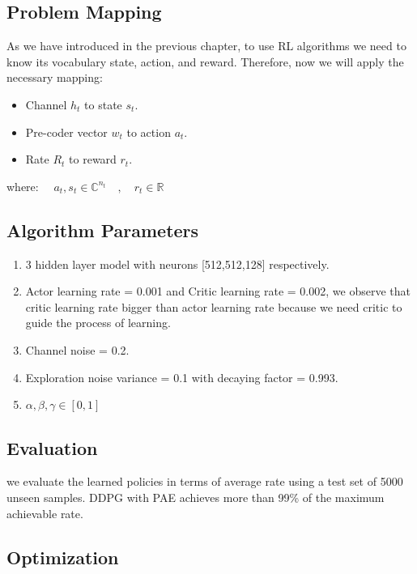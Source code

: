 \subsection{Problem Mapping}
As we have introduced in the previous chapter, to use RL algorithms we need to know its vocabulary state, action, and reward. Therefore, now we will apply the necessary mapping:
\begin{itemize}
    \item Channel $h_t$ to state $s_t$.
    \item Pre-coder vector $w_t$ to action $a_t$.
    \item Rate $R_t$ to reward $r_t$.
\end{itemize}
where: $\quad a_t, s_t \in \mathbb{C}^{n_t} \quad , \quad r_t \in \mathbb{R}$

\subsection{Algorithm Parameters}
\begin{enumerate}
    \item 3 hidden layer model with neurons [512,512,128] respectively.
    \item Actor learning rate = 0.001 and Critic learning rate = 0.002, we observe that critic learning rate bigger than actor learning rate because we need critic to guide the process of learning.
    \item Channel noise = 0.2.
    \item Exploration noise variance = 0.1 with decaying factor = 0.993.
    \item $\alpha, \beta, \gamma \in [0,1]$
\end{enumerate}

\subsection{Evaluation}
we evaluate the learned policies in terms of average rate using a test set of 5000 unseen samples. DDPG with PAE achieves more than 99\% of the maximum achievable rate.

\subsection{Optimization}
